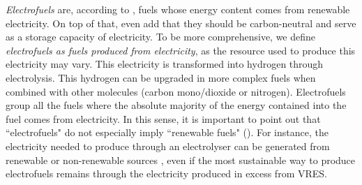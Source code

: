 

\textit{Electrofuels} are, according to \citet{JRC_alternative}, fuels whose energy content comes from renewable electricity. On top of that, \citet{goldmann2018} even add that they should be carbon-neutral and serve as a storage capacity of electricity. To be more comprehensive, we define \textit{electrofuels as fuels produced from electricity}, as the resource used to produce this electricity may vary. This electricity is transformed into hydrogen through electrolysis. This hydrogen can be upgraded in more complex fuels when combined with other molecules (\eg carbon mono/dioxide or nitrogen). Electrofuels group all the fuels where the absolute majority of the energy contained into the fuel comes from electricity. In this sense, it is important to point out that ``electrofuels" do not especially imply ``renewable fuels" (). For instance, the electricity needed to produce  through an electrolyser can be generated from renewable or non-renewable sources \cite{bhandari2014}, even if the most sustainable way to produce electrofuels remains through the electricity produced in excess from VRES.

